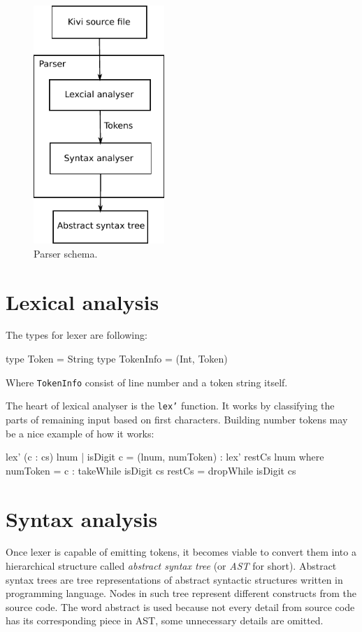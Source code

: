 \documentclass[12pt,a4paper]{report}
\begin{document}
\vspace*{0.2in}
\begin{figure}[h!]
  \centering
  \includegraphics[height=9cm]{parser}
  \caption{Parser schema.}
  \label{fig:parser}
\end{figure}

\section{Lexical analysis}

The types for lexer are following:

\vspace*{0.2in}
\begin{code}[style=haskell]
  type Token = String
  type TokenInfo = (Int, Token)
\end{code}

Where \texttt{TokenInfo} consist of line number and a token string itself.

The heart of lexical analyser is the \texttt{lex'} function. It works by
classifying the parts of remaining input based on first characters.  Building
number tokens may be a nice example of how it works:

\vspace*{0.2in}
\begin{code}[style=haskell,label=lst:lex_comment,caption={Building tokens from numbers.}]
  lex' (c : cs) lnum | isDigit c =
      (lnum, numToken) : lex' restCs lnum
      where
          numToken = c : takeWhile isDigit cs
          restCs = dropWhile isDigit cs
\end{code}


\section{Syntax analysis}
\label{sec:syntax_analysis}
Once lexer is capable of emitting tokens, it becomes viable to convert them
into a hierarchical structure called \textit{abstract syntax tree} (or
\textit{AST} for short). Abstract syntax trees are tree representations of
abstract syntactic structures written in programming language. Nodes in such
tree represent different constructs from the source code. The word abstract is
used because not every detail from source code has its corresponding piece in
AST, some unnecessary details are omitted.
\end{document}
